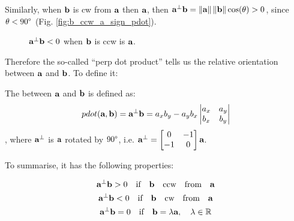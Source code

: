 \documentclass[a4paper]{article}
\begin{document}
Similarly, when $\textbf{b}$ is cw from $\textbf{a}$ then $\textbf{a}$, then $\textbf{a}^{\bot}\textbf{b} = \left\lVert\textbf{a}\right\rVert\left\lVert\textbf{b}\right\rVert\cos(\theta) > 0$, since $\theta < 90\degree$ (Fig. \ref{fig:b_ccw_a_sign_pdot}).

\begin{figure}[H]
    \centering
    \qquad
    \caption{$\textbf{a}^{\bot}\textbf{b} <0$ when $\textbf{b}$ is ccw is $\textbf{a}$.}%
    \label{fig:b_cw_a_sign_pdot}%
\end{figure}

Therefore the so-called ``perp dot product'' tells us the relative orientation between $\textbf{a}$ and $\textbf{b}$. To define it:

\begin{definition}
The  between $\textbf{a}$ and $\textbf{b}$ is defined as:
\begin{equation}
    pdot(\textbf{a}, \textbf{b}) = \textbf{a} ^{\bot} \textbf{b}  = 
    a_xb_y - a_yb_x
    \left|
    \begin{matrix}
    a_x & a_y \\
    b_x & b_y
    \end{matrix}
    \right |
\end{equation}
, where $\textbf{a}^{\bot}$ is $\textbf{a}$ rotated by $90\degree$, i.e. $\textbf{a}^{\bot} = \begin{bmatrix}
0 & -1 \\-1 & 0\end{bmatrix}\textbf{a}$.
\end{definition}
To summarise, it has the following properties:
\begin{corollary}
\label{cor:prop_pdot_prod}
\begin{gather}
    \textbf{a}^{\bot} \textbf{b} > 0 \quad \textup{if} \quad \textbf{b} \quad \textup{ccw} \quad \textup{from} \quad \textbf{a} \label{eq:prop_pdot_ccw}\\
    \textbf{a}^{\bot} \textbf{b} < 0 \quad \textup{if} \quad \textbf{b} \quad \textup{cw} \quad \textup{from} \quad \textbf{a} \label{eq:prop_pdot_cw}
    \\
    \textbf{a}^{\bot} \textbf{b} = 0 \quad \textup{if} \quad \textbf{b} = \lambda \textbf{a}, \quad \lambda \in \mathbb{R}
    \label{eq:prop_pdot_par}
\end{gather}
\end{corollary}
\end{document}
